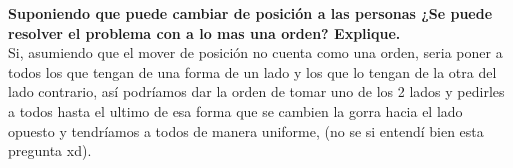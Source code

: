 \textbf{Suponiendo que puede cambiar de posición a las personas ¿Se puede resolver el problema con a lo mas una orden? Explique.}\\

Si, asumiendo que el mover de posición no cuenta como una orden, seria poner a todos los que tengan de una forma de un lado y los que lo tengan de la otra del lado contrario, así podríamos dar la orden de tomar uno de los 2 lados y pedirles a todos hasta el ultimo de esa forma que se cambien la gorra hacia el lado opuesto y tendríamos a todos de manera uniforme, (no se si entendí bien esta pregunta xd).\\
